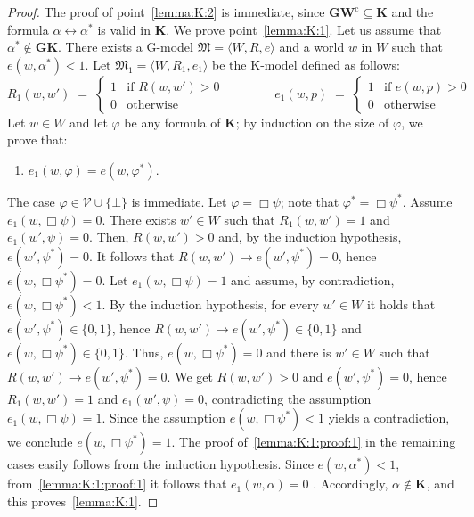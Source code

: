 \documentclass[copyright,creativecommons]{eptcs}
\newcommand{\GKL}{\mathbf{GK}}
\newcommand{\GWCL}{\mathbf{GW}^\mathrm{c}}
\newcommand{\GM}{\mbox{$\mathrm{G}$}}
\newcommand{\KM}{\mbox{$\mathrm{K}$}}
\newcommand{\KL}{\mathbf{K}}
\newcommand{\tto}{\leftrightarrow}
\newcommand{\PV}{\Vcal}
\newcommand{\stru}[1]{\langle #1 \rangle} %
\newcommand{\M}{\mathfrak{M}}
\renewcommand{\a}{\alpha}
\newcommand{\Vcal}{\mathcal{V}}
\begin{document}
\begin{proof}
The  proof of point~\ref{lemma:K:2} is immediate, since
  $\GWCL\subseteq \KL$ and the formula  $\a\tto \a^*$  is valid in  $\KL$.
  We prove  point~\ref{lemma:K:1}. Let us assume that $\a^*\not\in \GKL$.
  There exists a $\GM$-model $\M=\stru{W,R,e}$ and  a world $w$ in $W$ such that $e(w,\a^*)< 1$.
Let $\M_1=\stru{W,R_1,e_1}$ be the   $\KM$-model  defined as follows:
\[
  R_1(w,w')\;=\;
  \begin{cases}
  1 &\text{if $R(w,w') > 0$}  
    \\
 0 & \text{otherwise}   
  \end{cases}
\hspace{4em}
  e_1(w,p)\;=\;
  \begin{cases}
  1 &\text{if $e(w,p) > 0$}  
    \\
 0 & \text{otherwise} 
\end{cases}
 \]  
 Let $w\in W$ and let $\varphi$ be any formula  of $\KL$; by induction on the size of $\varphi$, we prove that:
 \begin{enumerate}[label=(\Alph*), ref=(\Alph*),leftmargin=*]    
 \item\label{lemma:K:1:proof:1}
   $e_1(w,\varphi)= e(w,\varphi^*)$.
 \end{enumerate}
 The  case  $\varphi\in\PV\cup\{\bot\}$ is immediate.
  Let $\varphi = \Box \psi$;
note that $\varphi^*=\Box \psi^*$.
 Assume $e_1(w,  \Box \psi)=0$.
 There exists $w'\in W$ such that $R_1(w,w')=1$ and $e_1(w',   \psi)=0$.
 Then,  $R(w,w')>0$ and, by the induction hypothesis,   $e(w',   \psi^*)=0$.
 It follows that $R(w,w')\to e(w',   \psi^*)=0$, hence  $e(w,  \Box \psi^*)=0$.
 Let $e_1(w,  \Box \psi)=1$ and assume, by contradiction,  $e(w,  \Box \psi^*) <  1$.
 By the induction hypothesis,  for every $w' \in W$ it holds that  $e(w',\psi^*)\in\{0,1\}$,
 hence  $R(w,w')\to e(w',\psi^*) \in \{0,1\}$ and  $e(w,  \Box \psi^*) \in \{0, 1\}$.
 Thus,   $e(w,  \Box \psi^*) =  0$ and
 there is  $w'\in W$ such that  $R(w,w')\to e(w',\psi^*) = 0$.
 We get   $R(w,w') > 0$ and  $e(w',\psi^*)=0$,
 hence $R_1(w,w') = 1$ and  $e_1(w',  \psi)=0$,
 contradicting the assumption  $e_1(w,  \Box \psi)=1$.
Since the assumption $e(w,  \Box \psi^*) <  1$ yields a contradiction, 
 we conclude    $e(w,  \Box \psi^*) = 1$.
The proof of~\ref{lemma:K:1:proof:1} in the remaining cases easily follows from the induction hypothesis.
Since  $e(w,\a^*)< 1$, from~\ref{lemma:K:1:proof:1} it follows that
$e_1(w,\a) = 0$ . Accordingly, $\a\not\in\KL$,
and this proves~\ref{lemma:K:1}.
\end{proof}
\end{document}
